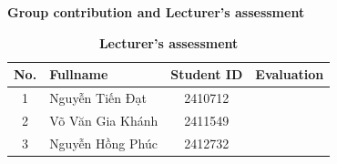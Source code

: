 \thispagestyle{empty}

\vspace*{\fill}

\begin{center}
    \LARGE\textbf{Group contribution and Lecturer's assessment}
\end{center}

\vspace{2em}

\begin{table}[H]
    \centering
    \caption*{\textbf{Group contribution}}
\end{table}

\vspace{2em}

\begin{table}[H]
    \centering
    \caption*{\textbf{Lecturer's assessment}}
    \begin{tabular}{|c|l|c|c|}
        \hline
        \textbf{No.} & \textbf{Fullname} & \textbf{Student ID} & \textbf{Evaluation} \\
        \hline
        1            & Nguyễn Tiến Đạt      & 2410712             &                     \\
        2            & Võ Văn Gia Khánh      & 2411549             &                     \\
        3            & Nguyễn Hồng Phúc      & 2412732             &                     \\
        \hline
    \end{tabular}
\end{table}

\vspace*{\fill}
\newpage
